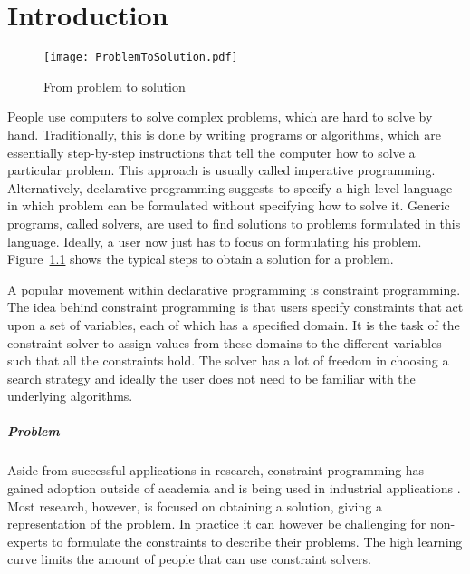 \chapter{Introduction}
\label{cha:intro}

\begin{figure}

	\caption{From problem to solution}
	\centering
		\texttt{[image: ProblemToSolution.pdf]}
	\label{fig:problem_to_solution}

\end{figure}

People use computers to solve complex problems, which are hard to solve by hand. Traditionally, this is done by writing programs or algorithms, which are essentially step-by-step instructions that tell the computer how to solve a particular problem. This approach is usually called imperative programming. Alternatively, declarative programming suggests to specify a high level language in which problem can be formulated without specifying how to solve it. Generic programs, called solvers, are used to find solutions to problems formulated in this language. Ideally, a user now just has to focus on formulating his problem. Figure~\ref{fig:problem_to_solution} shows the typical steps to obtain a solution for a problem.

A popular movement within declarative programming is constraint programming. The idea behind constraint programming is that users specify constraints that act upon a set of variables, each of which has a specified domain. It is the task of the constraint solver to assign values from these domains to the different variables such that all the constraints hold. The solver has a lot of freedom in choosing a search strategy and ideally the user does not need to be familiar with the underlying algorithms.

\paragraph{Problem}
Aside from successful applications in research, constraint programming has gained adoption outside of academia and is being used in industrial applications \cite{Simonis:IndustrialApplicationsCP}. Most research, however, is focused on obtaining a solution, giving a representation of the problem. In practice it can however be challenging for non-experts to formulate the constraints to describe their problems. The high learning curve limits the amount of people that can use constraint solvers.

